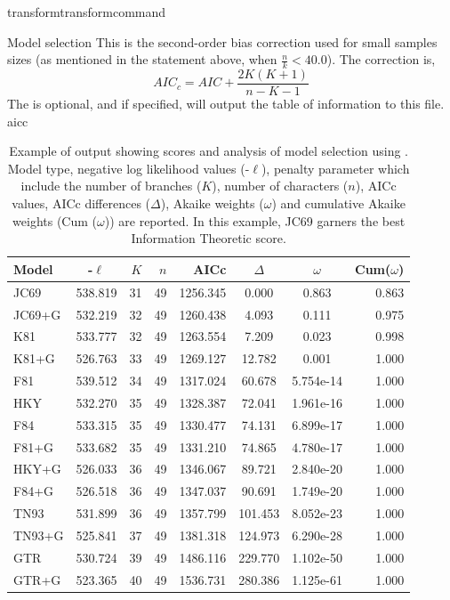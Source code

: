 \begin{command}{transform}{transformcommand}
\begin{arguments}
\begin {argumentgroup}{Model selection}
{This is the second-order bias correction used for small
samples sizes (as mentioned in the statement above, when
$\frac{n}{k} < 40.0$). The correction is,
\begin{equation*}
AIC_c = AIC + \frac{2K(K+1)} {n-K-1}
\end{equation*}
The \poystring is optional, and if specified, 
\poy will output the table of information to this file.}
{aicc}

\begin{table}[t]
\small
\caption{Example of \poy output showing scores and analysis of model 
selection using . Model type, negative log likelihood 
values (-$\ell$), penalty parameter which include the number of branches
($K$), number of characters ($n$), AICc values, AICc differences (${\Delta}$), 
Akaike weights (${\omega}$) and cumulative Akaike weights (Cum (${\omega}$)) are reported.
In this example, JC69 garners the best Information Theoretic score. }
\label {ModelSelectionReport}
\begin{center}
\begin{tabular}{ l c r r r c c r }
\hline
Model &-$\ell$ & $K$ & $n$ & AICc  & ${\Delta}$ &${\omega}$ & Cum(${\omega}$)\\
\hline
JC69 &538.819&31&49&1256.345& 0.000&0.863  &0.863 \\
JC69+G&532.219&32&49&1260.438& 4.093&0.111  &0.975 \\
K81  &533.777&32&49&1263.554& 7.209&0.023  &0.998 \\
K81+G &526.763&33&49&1269.127& 12.782&0.001  &1.000 \\
F81  &539.512&34&49&1317.024& 60.678&5.754e-14&1.000 \\
HKY  &532.270&35&49&1328.387& 72.041&1.961e-16&1.000 \\
F84  &533.315&35&49&1330.477& 74.131&6.899e-17&1.000 \\
F81+G &533.682&35&49&1331.210& 74.865&4.780e-17&1.000 \\
HKY+G &526.033&36&49&1346.067& 89.721&2.840e-20&1.000 \\
F84+G &526.518&36&49&1347.037& 90.691&1.749e-20&1.000 \\
TN93 &531.899&36&49&1357.799&101.453&8.052e-23&1.000 \\
TN93+G&525.841&37&49&1381.318&124.973&6.290e-28&1.000 \\
GTR  &530.724&39&49&1486.116&229.770&1.102e-50&1.000 \\
GTR+G &523.365&40&49&1536.731&280.386&1.125e-61&1.000 \\
\hline
\end{tabular}
\end{center}
\end{table}


\end{argumentgroup}
\end{arguments}
\end{command}
